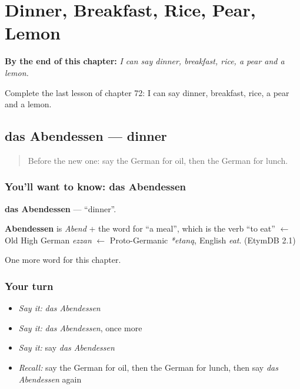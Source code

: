 
\chapter{Dinner, Breakfast, Rice, Pear, Lemon}
\label{ch:ge-dinner-breakfast-rice-pear-lemon}

\begin{chapteropening}
\textbf{By the end of this chapter:} \emph{I can say dinner, breakfast, rice, a pear and a lemon.}

Complete the last lesson of chapter 72: I can say dinner, breakfast, rice, a pear and a lemon.
\end{chapteropening}

\section[das Abendessen]{das Abendessen — dinner}

\label{lesson:GE-C72-abendessen}



\begin{quote}
Before the new one: say the German for oil, then the German for lunch.
\end{quote}

\subsection*{You'll want to know: das Abendessen}
\textbf{das Abendessen} — \textquotedblleft{}dinner\textquotedblright{}.

\begin{cousinweb}
\textbf{Abendessen} is \emph{Abend} + the word for \textquotedblleft{}a meal\textquotedblright{}, which is the verb \textquotedblleft{}to eat\textquotedblright{} $\leftarrow$ Old High German \emph{ezzan} $\leftarrow$ Proto-Germanic \emph{*etaną}, English \emph{eat}. (EtymDB 2.1)
\end{cousinweb}

\begin{grammarlens}[title={What you've built}]
One more word for this chapter.
\end{grammarlens}

\subsection*{Your turn}
\begin{itemize}
\raggedright
  \item \emph{Say it:} \emph{das Abendessen}
  \item \emph{Say it:} \emph{das Abendessen}, once more
  \item \emph{Say it:} say \emph{das Abendessen}
  \item \emph{Recall:} say the German for oil, then the German for lunch, then say \emph{das Abendessen} again
\end{itemize}

